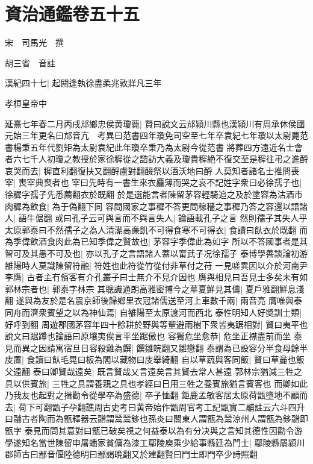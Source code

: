 \section{資治通鑑卷五十五}
宋　司馬光　撰

胡三省　音註

漢紀四十七|{
	起閼逢執徐盡柔兆敦牂凡三年}


孝桓皇帝中

延熹七年春二月丙戌邟鄉忠侯黄瓊薨|{
	賢曰說文云邟潁川縣也漢潁川有周承休侯國元始三年更名曰邟音亢　考異曰范書四年瓊免司空至七年卒袁紀七年瓊以太尉薨范書楊秉五年代劉矩為太尉袁紀此年瓊卒秉乃為太尉今從范書}
將葬四方遠近名士會者六七千人初瓊之教授於家徐穉從之諮訪大義及瓊貴穉絶不復交至是穉往弔之進酹哀哭而去|{
	穉直利翻復扶又翻酹盧對翻醊祭以酒沃地曰酹}
人莫知者諸名士推問喪宰|{
	喪宰典喪者也}
宰曰先時有一書生來衣麤薄而哭之哀不記姓字衆曰必徐孺子也|{
	徐穉字孺子先悉薦翻衣於既翻}
於是選能言者陳留茅容輕騎追之及於塗容為沽酒市肉穉為飲食|{
	為于偽翻下同}
容問國家之事穉不答更問稼穡之事穉乃答之容還以語諸人|{
	語牛倨翻}
或曰孔子云可與言而不與言失人|{
	論語載孔子之言}
然則孺子其失人乎太原郭泰曰不然孺子之為人清潔高亷飢不可得食寒不可得衣|{
	食讀曰飤衣於既翻}
而為季偉飲酒食肉此為已知季偉之賢故也|{
	茅容字季偉此為如字}
所以不答國事者是其智可及其愚不可及也|{
	亦以孔子之言語諸人蓋以甯武子况徐孺子}
泰博學善談論初游雒陽時人莫識陳留符融|{
	符姓也此符從竹從付非草付之苻}
一見嗟異因以介於河南尹李膺|{
	古者主冇儐客有介孔叢子曰士無介不見介因也}
膺與相見曰吾見士多矣未有如郭林宗者也|{
	郭泰字林宗}
其聰識通朗高雅密博今之華夏鮮見其儔|{
	夏戶雅翻鮮息淺翻}
遂與為友於是名震京師後歸鄉里衣冠諸儒送至河上車數千兩|{
	兩音亮}
膺唯與泰同舟而濟衆賓望之以為神仙焉|{
	自雒陽至太原渡河而西北}
泰性明知人好奬訓士類|{
	好呼到翻}
周遊郡國茅容年四十餘耕於野與等輩避雨樹下衆皆夷踞相對|{
	賢曰夷平也說文曰踞蹲也論語曰原壤夷俟言平坐踞傲也}
容獨危坐愈恭|{
	危坐正襟盡前而坐}
泰見而異之因請寓宿旦日容殺雞為饌|{
	饌雛皖翻又雛戀翻}
泰謂為已設容分半食母餘半庋置|{
	食讀曰飤毛晃曰板為閣以藏物曰庋舉綺翻}
自以草蔬與客同飯|{
	賢曰草麄也飯父遠翻}
泰曰卿賢哉遠矣|{
	既言賢哉乂言遠矣言其賢去常人甚遠}
郭林宗猶減三牲之具以供賓旅|{
	三牲之具謂養親之具也孝經曰日用三牲之養賓旅猶言賓客也}
而卿如此乃我友也起對之揖勸令從學卒為盛德|{
	卒子恤翻}
鉅鹿孟敏客居太原荷甑墮地不顧而去|{
	荷下可翻甑子孕翻譙周古史考曰黄帝始作甑周官考工記甑實二鬴註云六斗四升曰鬴古者陶而為甑釋器云䰝謂鬵鬵鉹也孫炎曰關東人謂甑為鬵涼州人謂甑為鉹䰝即甑字}
泰見而問其意對曰甑已破矣視之何益泰以為有分决與之言知其德性因勸令游學遂知名當世陳留申屠蟠家貧傭為漆工鄢陵庾乘少給事縣廷為門士|{
	鄢陵縣屬潁川郡師古曰鄢音偃陸德明曰鄢謁晩翻又於建翻賢曰門士即門卒少詩照翻}
